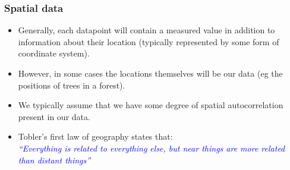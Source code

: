 \documentclass[parskip,12pt]{beamer}
\begin{document}
\begin{frame}
\frametitle{Spatial data}
 \begin{itemize}
\item Generally, each datapoint will contain a measured value in addition to information about their location (typically represented by some form of coordinate system).
\vspace{3mm}
\item However, in some cases the locations themselves will be our data (eg the positions of trees in a forest).
\vspace{3mm}
\item We typically assume that we have some degree of spatial autocorrelation present in our data.
\vspace{3mm}
\item Tobler's first law of geography states that:\\ \textcolor{blue}{\emph{“Everything is related to everything else, but near things are more related than distant things”}}
\end{itemize}
\end{frame}
\end{document}
